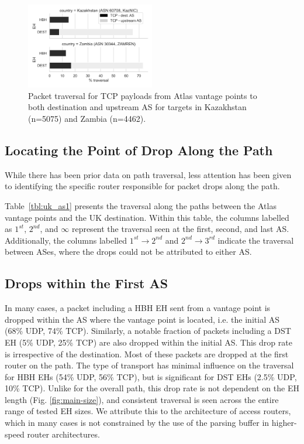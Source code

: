 \documentclass[conference]{IEEEtran}
\begin{document}

\begin{figure}
\centering
  \includegraphics[width=0.5\textwidth]{traversal-pathologies.png}
  \caption{Packet traversal for TCP payloads from Atlas vantage points to both destination and upstream
AS for targets in Kazakhstan (n=5075) and Zambia (n=4462).}
  \label{fig:traversal_pathologies}
\end{figure}

\subsection{Locating the Point of Drop Along the Path}

While there has been prior data on path traversal, less attention has been
given to identifying the specific router responsible for packet drops along the
path.

Table~\ref{tbl:uk_as1} presents the traversal along the
paths between the Atlas vantage points and the UK destination.
Within this table, the columns labelled as $1^{st}$, $2^{nd}$, and $\infty$
represent the traversal seen at the first, second, and last AS.
Additionally, the columns labelled $1^{st}\rightarrow 2^{nd}$ and
$2^{nd}\rightarrow 3^{rd}$ indicate the traversal
between ASes, where the drops could not be attributed to either AS.
\subsection{Drops within the First AS}

In many cases, a packet including a HBH EH sent from a vantage point is dropped within the AS where the vantage point is located, i.e. the initial AS (68\% UDP, 74\% TCP). Similarly, a notable fraction of packets including a DST EH (5\% UDP, 25\% TCP) are also dropped within the
initial AS. This drop rate is irrespective of the destination.
Most of these packets are dropped at the first router on the path. The type of transport has minimal influence on the traversal for HBH EHs (54\% UDP, 56\% TCP), but is significant for DST EHs (2.5\% UDP, 10\% TCP).
Unlike for the overall path, this drop rate is not dependent on the EH length (Fig. \ref{fig:main-size}), and consistent traversal is seen across the entire range of tested EH sizes. We attribute this to the architecture of access routers, which in many cases is not constrained by the use of the parsing buffer in higher-speed router architectures.
\end{document}
